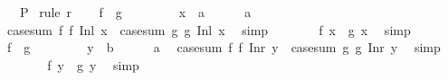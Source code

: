 \begin{isabellebody}
\ \ \ P\isanewline
%
\isadelimproof
%
\endisadelimproof
%
\isatagproof
{}\isamarkupfalse%
\ {\isacharparenleft}{\kern0pt}rule\ r{\isacharparenright}{\kern0pt}\isanewline
\ \ \isamarkupfalse%
\ {\isachardoublequoteopen}f{}\ {\isacharequal}{\kern0pt}\ g{}{\isachardoublequoteclose}\isanewline
\ \ \isamarkupfalse%
\isanewline
\ \ \ \ \isamarkupfalse%
\ x\ {\isacharcolon}{\kern0pt}{\isacharcolon}{\kern0pt}\ {\isacharprime}{\kern0pt}a\isanewline
\ \ \ \ \isamarkupfalse%
\ a\ \isamarkupfalse%
\ {\isachardoublequoteopen}case{\isacharunderscore}{\kern0pt}sum\ f{}\ f{}\ {\isacharparenleft}{\kern0pt}Inl\ x{\isacharparenright}{\kern0pt}\ {\isacharequal}{\kern0pt}\ case{\isacharunderscore}{\kern0pt}sum\ g{}\ g{}\ {\isacharparenleft}{\kern0pt}Inl\ x{\isacharparenright}{\kern0pt}{\isachardoublequoteclose}\ \isamarkupfalse%
\ simp\isanewline
\ \ \ \ \isamarkupfalse%
\ \isamarkupfalse%
\ {\isachardoublequoteopen}f{}\ x\ {\isacharequal}{\kern0pt}\ g{}\ x{\isachardoublequoteclose}\ \isamarkupfalse%
\ simp\isanewline
\ \ \isamarkupfalse%
\isanewline
\ \ \isamarkupfalse%
\ {\isachardoublequoteopen}f{}\ {\isacharequal}{\kern0pt}\ g{}{\isachardoublequoteclose}\isanewline
\ \ \isamarkupfalse%
\isanewline
\ \ \ \ \isamarkupfalse%
\ y\ {\isacharcolon}{\kern0pt}{\isacharcolon}{\kern0pt}\ {\isacharprime}{\kern0pt}b\isanewline
\ \ \ \ \isamarkupfalse%
\ a\ \isamarkupfalse%
\ {\isachardoublequoteopen}case{\isacharunderscore}{\kern0pt}sum\ f{}\ f{}\ {\isacharparenleft}{\kern0pt}Inr\ y{\isacharparenright}{\kern0pt}\ {\isacharequal}{\kern0pt}\ case{\isacharunderscore}{\kern0pt}sum\ g{}\ g{}\ {\isacharparenleft}{\kern0pt}Inr\ y{\isacharparenright}{\kern0pt}{\isachardoublequoteclose}\ \isamarkupfalse%
\ simp\isanewline
\ \ \ \ \isamarkupfalse%
\ \isamarkupfalse%
\ {\isachardoublequoteopen}f{}\ y\ {\isacharequal}{\kern0pt}\ g{}\ y{\isachardoublequoteclose}\ \isamarkupfalse%
\ simp\isanewline
\ \ \isamarkupfalse%
\isanewline
{}\isamarkupfalse%
%
\endisatagproof
{\isafoldproof}%
%
\isadelimproof
\isanewline
%
\endisadelimproof
\isanewline

\end{isabellebody}
